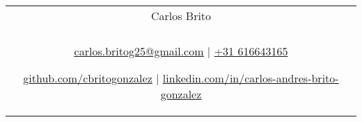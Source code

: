 \documentclass[a4paper,8pt]{article}
\begin{document}
\pagestyle{empty} 


\begin{tabularx}{\linewidth}{@{} C @{}}
\color[HTML]{1C033C} \Huge{Carlos Brito} \\[6pt]
\\
\textcolor[HTML]{371e77}{\underline{\href{mailto:carlos.britog25@gmail.com}{\raisebox{-0.05\height}{\faEnvelope} carlos.britog25@gmail.com}} $|$}
\textcolor[HTML]{371e77}{\href{tel:+525513219900}{\raisebox{-0.05\height}{\faMobile} +31 616643165}}

\textcolor[HTML]{371e77}{\underline{\href{https://github.com/cbritogonzalez}{\raisebox{-0.05\height}{\faGithub} github.com/cbritogonzalez}} $|$}
\textcolor[HTML]{371e77}{\underline{\href{https://linkedin.com/in/carlos-andres-brito-gonzalez}{\raisebox{-0.05\height}{\faLinkedin} linkedin.com/in/carlos-andres-brito-gonzalez}}}
\end{tabularx}

\end{document}
